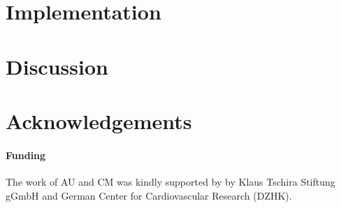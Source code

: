 \documentclass{bioinfo}
\begin{document}
\section*{Implementation}

\section*{Discussion}

\section*{Acknowledgements}
\paragraph{Funding\textcolon} 
The work of AU and CM was kindly supported by
by Klaus Tschira Stiftung gGmbH and German Center for Cardiovascular Research (DZHK).

%
%
%
%
%
%
%

\end{document}
